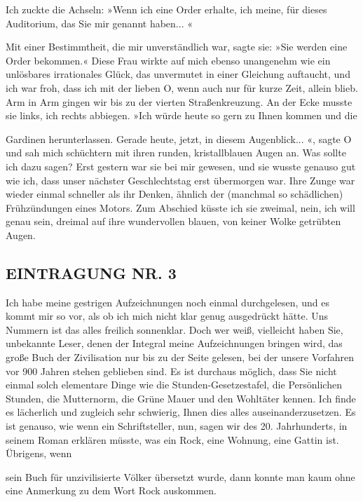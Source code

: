 Ich zuckte die Achseln: »Wenn ich eine Order erhalte, ich meine,
für dieses Auditorium, das Sie mir genannt haben... «

Mit einer Bestimmtheit, die mir unverständlich war, sagte sie: »Sie
werden eine Order bekommen.« Diese Frau wirkte auf mich ebenso
unangenehm wie ein unlösbares irrationales Glück, das unvermutet in
einer Gleichung auftaucht, und ich war froh, dass ich mit der
lieben O, wenn auch nur für kurze Zeit, allein blieb. Arm in Arm
gingen wir bis zu der vierten Straßenkreuzung. An der Ecke musste
sie links, ich rechts abbiegen. »Ich würde heute so gern zu Ihnen
kommen und die

Gardinen herunterlassen. Gerade heute, jetzt, in diesem
Augenblick... «, sagte O und sah mich schüchtern mit ihren runden,
kristallblauen Augen an. Was sollte ich dazu sagen? Erst gestern
war sie bei mir gewesen, und sie wusste genauso gut wie ich, dass
unser nächster Geschlechtstag erst übermorgen war. Ihre Zunge war
wieder einmal schneller als ihr Denken, ähnlich der (manchmal so
schädlichen) Frühzündungen eines Motors. Zum Abschied küsste ich
sie zweimal, nein, ich will genau sein, dreimal auf ihre
wundervollen blauen, von keiner Wolke getrübten Augen.

\subsection{EINTRAGUNG NR. 3}

Ich habe meine gestrigen Aufzeichnungen noch einmal durchgelesen,
und es kommt mir so vor, als ob ich mich nicht klar genug
ausgedrückt hätte. Uns Nummern ist das alles freilich sonnenklar.
Doch wer weiß, vielleicht haben Sie, unbekannte Leser, denen der
Integral meine Aufzeichnungen bringen wird, das große Buch der
Zivilisation nur bis zu der Seite gelesen, bei der unsere Vorfahren
vor 900 Jahren stehen geblieben sind. Es ist durchaus möglich, dass
Sie nicht einmal solch elementare Dinge wie die
Stunden-Gesetzestafel, die Persönlichen Stunden, die Mutternorm,
die Grüne Mauer und den Wohltäter kennen. Ich finde es lächerlich
und zugleich sehr schwierig, Ihnen dies alles auseinanderzusetzen.
Es ist genauso, wie wenn ein Schriftsteller, nun, sagen wir des 20.
Jahrhunderts, in seinem Roman erklären müsste, was ein Rock, eine
Wohnung, eine Gattin ist. Übrigens, wenn

sein Buch für unzivilisierte Völker übersetzt wurde, dann konnte
man kaum ohne eine Anmerkung zu dem Wort Rock auskommen.


